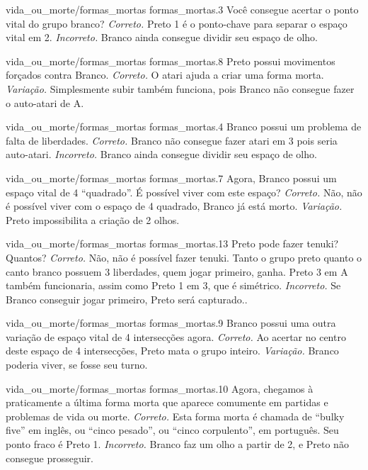 \problemAnswerDiagram
  {vida_ou_morte/formas_mortas}
  {formas_mortas.3}
  {Você consegue acertar o ponto vital do grupo branco?}
  {\emph{Correto.} Preto 1 é o ponto-chave para separar o espaço vital em 2.}
  {\emph{Incorreto.} Branco ainda consegue dividir seu espaço de olho.}

\problemAnswerDiagram
  {vida_ou_morte/formas_mortas}
  {formas_mortas.8}
  {Preto possui movimentos forçados contra Branco.}
  {\emph{Correto.} O atari ajuda a criar uma forma morta.}
  {\emph{Variação.} Simplesmente subir também funciona, pois Branco não consegue fazer o auto-atari de A.}

\problemAnswerDiagram
  {vida_ou_morte/formas_mortas}
  {formas_mortas.4}
  {Branco possui um problema de falta de liberdades.}
  {\emph{Correto.} Branco não consegue fazer atari em 3 pois seria auto-atari.}
  {\emph{Incorreto.} Branco ainda consegue dividir seu espaço de olho.}

\problemAnswerDiagram
  {vida_ou_morte/formas_mortas}
  {formas_mortas.7}
  {Agora, Branco possui um espaço vital de 4 ``quadrado''. É possível viver com este espaço?}
  {\emph{Correto.} Não, não é possível viver com o espaço de 4 quadrado, Branco já está morto.}
  {\emph{Variação.} Preto impossibilita a criação de 2 olhos.}

\problemAnswerDiagram
  {vida_ou_morte/formas_mortas}
  {formas_mortas.13}
  {Preto pode fazer tenuki? Quantos?}
  {\emph{Correto.} Não, não é possível fazer tenuki. Tanto o grupo preto quanto o canto branco possuem 3 liberdades, quem jogar primeiro, ganha. Preto 3 em A também funcionaria, assim como Preto 1 em 3, que é simétrico.}
  {\emph{Incorreto.} Se Branco conseguir jogar primeiro, Preto será capturado..}

\problemAnswerDiagram
  {vida_ou_morte/formas_mortas}
  {formas_mortas.9}
  {Branco possui uma outra variação de espaço vital de 4 intersecções agora.}
  {\emph{Correto.} Ao acertar no centro deste espaço de 4 intersecções, Preto mata o grupo inteiro.}
  {\emph{Variação.} Branco poderia viver, se fosse seu turno.}

\problemAnswerDiagram
  {vida_ou_morte/formas_mortas}
  {formas_mortas.10}
  {Agora, chegamos à praticamente a última forma morta que aparece comumente em partidas e problemas de vida ou morte.}
  {\emph{Correto.} Esta forma morta é chamada de ``bulky five'' em inglês, ou ``cinco pesado'', ou ``cinco corpulento'', em português. Seu ponto fraco é Preto 1.}
  {\emph{Incorreto.} Branco faz um olho a partir de 2, e Preto não consegue prosseguir.}


